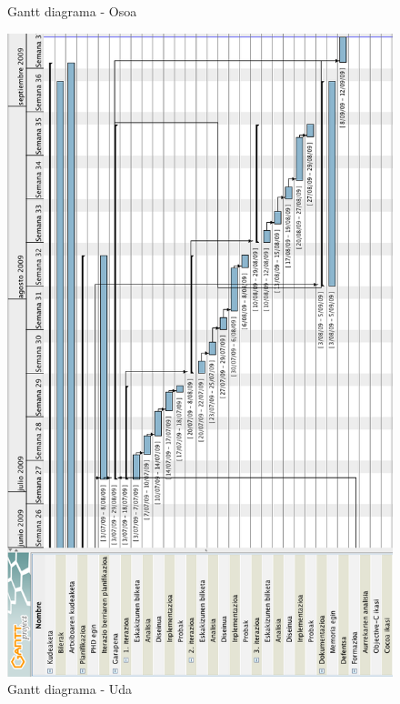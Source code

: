 \begin{figure}[htp]
\begin{center}
\caption{Gantt diagrama - Osoa}
\label{gantt.osoa}
\end{center}
\end{figure}

\begin{figure}[htp]
\begin{center}
\includegraphics[scale=0.46]{Pictures/Chapter3/Gantt-txikia.png}
\caption{Gantt diagrama - Uda}
\label{gantt.txikia}
\end{center}
\end{figure}

